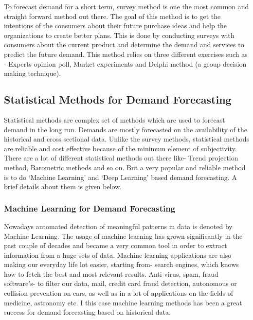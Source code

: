 To forecast demand for a short term, survey method is one the most common and straight forward method out there. The goal of this method is to get the intentions of the consumers about their future purchase ideas and help the organizations to create better plans. This is done by conducting surveys with consumers about the current product and determine the demand and services to predict the future demand. This method relies on three different exercises such as - Experts opinion poll, Market experiments and Delphi method (a group decision making technique).  

\subsection{Statistical Methods for Demand Forecasting}
\label{Statsistics}

Statistical methods are complex set of methods which are used to forecast demand in the long run. Demands are mostly forecasted on the availability of the historical and cross sectional data. Unlike the survey methods, statistical methods are reliable and cost effective because of the minimum element of subjectivity. There are a lot of different statistical methods out there like- Trend projection method, Barometric methods and so on. But a very popular and reliable method is to do `Machine Learning' and `Deep Learning' based demand forecasting. A brief details about them is given below. 



\subsubsection{Machine Learning for Demand Forecasting}
\label{MachineLearning}

Nowadays automated detection of meaningful patterns in data is denoted by Machine Learning. The usage of machine learning has grown significantly in the past couple of decades and became a very common tool in order to extract information from a huge sets of data. Machine learning applications are also making our everyday life lot easier, starting from- search engines, which knows how to fetch the best and most relevant results. Anti-virus, spam, fraud software’s- to filter our data, mail, credit card fraud detection, autonomous or collision prevention on cars, as well as in a lot of applications on the fields of medicine, astronomy etc. I this case machine learning methods has been a great success for demand forecasting based on historical data. 

